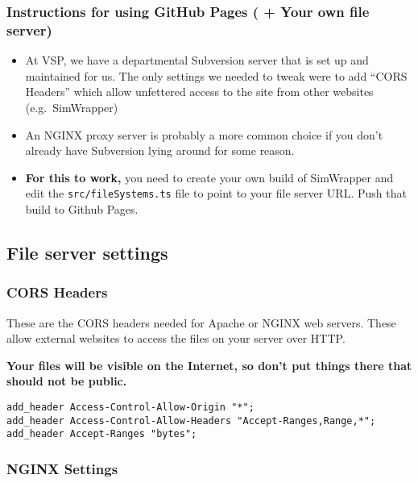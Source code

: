 \hypertarget{instructions-for-using-github-pages-your-own-file-server}{%
\subsubsection{Instructions for using GitHub Pages ( + Your own file
server)}\label{instructions-for-using-github-pages-your-own-file-server}}

\begin{itemize}
\item
  At VSP, we have a departmental Subversion server that is set up and
  maintained for us. The only settings we needed to tweak were to add
  ``CORS Headers'' which allow unfettered access to the site from other
  websites (e.g.~SimWrapper)
\item
  An NGINX proxy server is probably a more common choice if you don't
  already have Subversion lying around for some reason.
\item
  \textbf{For this to work,} you need to create your own build of
  SimWrapper and edit the \texttt{src/fileSystems.ts} file to point to
  your file server URL. Push that build to Github Pages.
\end{itemize}

\hypertarget{file-server-settings}{%
\subsection{File server settings}\label{file-server-settings}}

\hypertarget{cors-headers}{%
\subsubsection{CORS Headers}\label{cors-headers}}

These are the CORS headers needed for Apache or NGINX web servers. These
allow external websites to access the files on your server over HTTP.

\textbf{Your files will be visible on the Internet, so don't put things
there that should not be public.}

\begin{verbatim}
add_header Access-Control-Allow-Origin "*";
add_header Access-Control-Allow-Headers "Accept-Ranges,Range,*";
add_header Accept-Ranges "bytes";
\end{verbatim}

\hypertarget{nginx-settings}{%
\subsubsection{NGINX Settings}\label{nginx-settings}}

